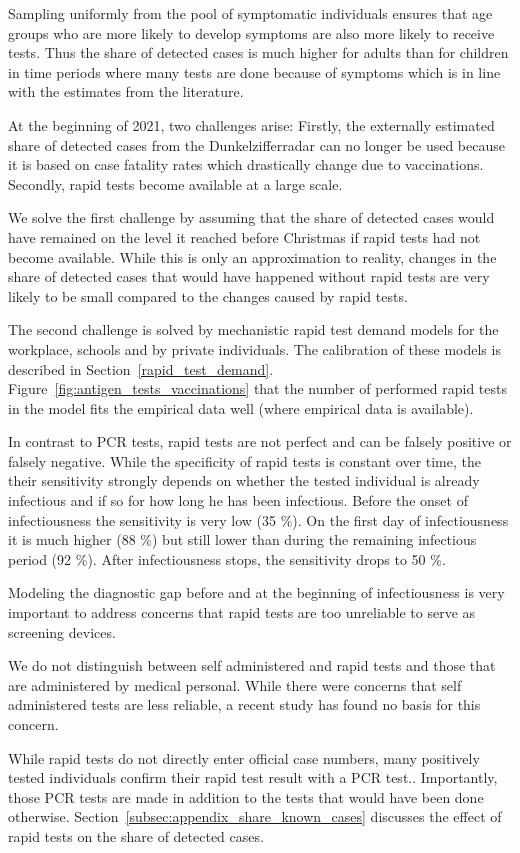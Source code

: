 Sampling uniformly from the pool of symptomatic individuals ensures that age groups
who are more likely to develop symptoms are also more likely to receive tests. Thus the
share of detected cases is much higher for adults than for children in time
periods where many tests are done because of symptoms which is in line with the
estimates from the literature.

At the beginning of 2021, two challenges arise: Firstly, the externally estimated share
of detected cases from the Dunkelzifferradar can no longer be used because it is based
on case fatality rates which drastically change due to vaccinations. Secondly, rapid
tests become available at a large scale.

We solve the first challenge by assuming that the share of detected cases would have
remained on the level it reached before Christmas if rapid tests had not become
available. While this is only an approximation to reality, changes in the share of
detected cases that would have happened without rapid tests are very likely to be small
compared to the changes caused by rapid tests.

The second challenge is solved by mechanistic rapid test demand models for the
workplace, schools and by private individuals. The calibration of these models is
described in Section~\ref{rapid_test_demand}.
Figure~\ref{fig:antigen_tests_vaccinations} that the number of performed rapid tests in
the model fits the empirical data well (where empirical data is available).

In contrast to PCR tests, rapid tests are not perfect and can be falsely positive or
falsely negative. While the specificity of rapid tests is constant over time, the
their sensitivity strongly depends on whether the tested individual is already
infectious and if so for how long he has been infectious. Before the onset of
infectiousness the sensitivity is very low (35 \%). On the first day of infectiousness
it is much higher (88 \%) but still lower than during the remaining infectious
period (92 \%). After infectiousness stops, the sensitivity drops to 50 \%.

Modeling the diagnostic gap before and at the beginning of infectiousness is very
important to address concerns that rapid tests are too unreliable to serve as screening
devices.

We do not distinguish between self administered and rapid tests and those that are
administered by medical personal. While there were concerns that self administered tests
are less reliable, a recent study has found no basis for this
concern.

While rapid tests do not directly enter official case numbers, many positively tested
individuals confirm their rapid test result with a PCR test..
Importantly, those PCR tests are made in addition to the tests that would have been
done otherwise. Section~\ref{subsec:appendix_share_known_cases} discusses the effect
of rapid tests on the share of detected cases.

